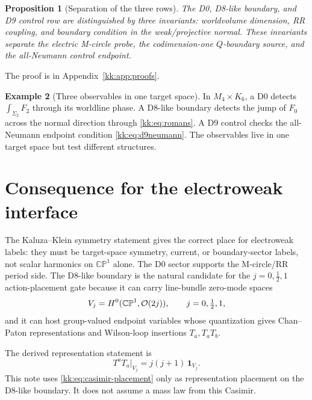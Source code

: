 \documentclass[11pt]{article}
\newcommand{\CP}{\mathbb{CP}}
\theoremstyle{plain}
\newtheorem{proposition}{Proposition}[section]
\theoremstyle{definition}
\newtheorem{example}[proposition]{Example}
\begin{document}
\begin{proposition}[Separation of the three rows]
\label{kk:prop:comparison}
The D0, D8-like boundary, and D9 control row are distinguished by three
invariants: worldvolume dimension, RR coupling, and boundary condition in the
weak/projective normal.  These invariants separate the electric M-circle probe,
the codimension-one \(Q\)-boundary source, and the all-Neumann control endpoint.
\end{proposition}
The proof is in Appendix~\ref{kk:app:proofs}.

\begin{example}[Three observables in one target space]
\label{kk:ex:three-observables}
In \(M_4\times K_6\), a D0 detects \(\int_{\Sigma_2}F_2\) through its
worldline phase.  A D8-like boundary detects the jump of \(F_0\) across the
normal direction through \eqref{kk:eq:romans}.  A D9 control checks the
all-Neumann endpoint condition \eqref{kk:eq:d9neumann}.  The observables live in
one target space but test different structures.
\end{example}

\section{Consequence for the electroweak interface}
\label{kk:sec:ew-interface}

The Kaluza--Klein symmetry statement gives the correct place for electroweak
labels: they must be target-space symmetry, current, or boundary-sector labels,
not scalar harmonics on \(\CP^1\) alone.  The D0 sector supports the M-circle/RR
period side.  The D8-like boundary is the natural candidate for the
\(j=0,\tfrac12,1\) action-placement gate because it can carry line-bundle
zero-mode spaces
\begin{equation}
  V_j=H^0(\CP^1,{\cal O}(2j)),\qquad j=0,\tfrac12,1,
  \label{kk:eq:vj}
\end{equation}
and it can host group-valued endpoint variables whose quantization gives
Chan--Paton representations and Wilson-loop insertions \(T_a,T_aT_b\).

The derived representation statement is
\begin{equation}
  T^aT_a\big|_{V_j}=j(j+1)\,\mathbf{1}_{V_j}.
  \label{kk:eq:casimir-placement}
\end{equation}
This note uses \eqref{kk:eq:casimir-placement} only as representation placement
on the D8-like boundary.  It does not assume a mass law from this Casimir.
\end{document}
